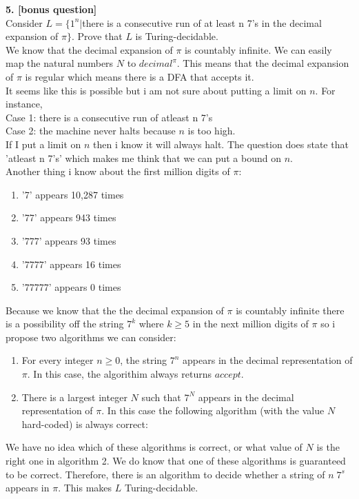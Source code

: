 \documentclass[a4paper,12pt]{article}
\begin{document}
\newpage
\textbf{5. [bonus question]} \\
Consider $L = \{ 1^{n} |$there is a consecutive run of at least n 7's in the decimal expansion of $\pi\}$. Prove that $L$ is Turing-decidable. \\
We know that the decimal expansion of $\pi$ is countably infinite. We can easily map the natural numbers $N$ to $decimal^{\pi}$. This means that the decimal expansion of $\pi$ is regular which means there is a DFA that accepts it. \\
It seems like this is possible but i am not sure about putting a limit on $n$. For instance,\\ Case 1: there is a consecutive run of atleast n 7's \\Case 2: the machine never halts because $n$ is too high. \\
If I put a limit on $n$ then i know it will always halt. The question does state that 'atleast n 7's' which makes me think that we can put a bound on $n$. \\
Another thing i know about the first million digits of $\pi$:
\begin{enumerate}
\item '7' appears 10,287 times
\item '77' appears 943 times
\item '777' appears 93 times
\item '7777' appears 16 times
\item '77777' appears 0 times
\end{enumerate}
Because we know that the the decimal expansion of $\pi$ is countably infinite there is a possibility off the string $7^{k}$ where $k \geq 5$ in the next million digits of $\pi$ so i propose two algorithms we can consider: \\
\begin{enumerate}
\item For every integer $n \geq 0$, the string $7^{n}$ appears in the decimal representation of $\pi$. In this case, the algorithim always returns $accept$.
\item There is a largest integer $N$ such that $7^{N}$ appears in the decimal representation of $\pi$. In this case the following algorithm (with the value $N$ hard-coded) is always correct:
\end{enumerate}

We have no idea which of these algorithms is correct, or what value of $N$ is the right one in algorithm 2. We do know that one of these algorithms is guaranteed to be correct. Therefore, there is an algorithm to decide whether a string of $n \; 7^{s}$ appears in $\pi$. This makes $L$ Turing-decidable.  
\end{document}
